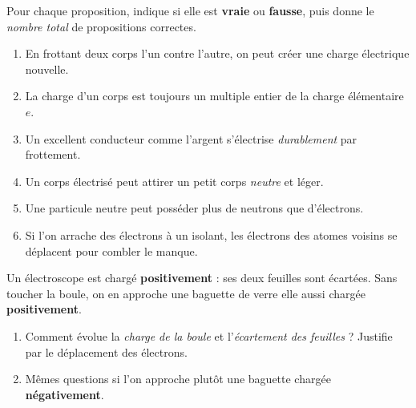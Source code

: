 \documentclass[11pt,a4paper]{article}
\begin{document}

\begin{exo}
Pour chaque proposition, indique si elle est \textbf{vraie} ou \textbf{fausse}, puis donne le
\emph{nombre total} de propositions correctes.
\begin{enumerate}[label=\alph*)]
  \item En frottant deux corps l'un contre l'autre, on peut créer une charge électrique nouvelle.
  \item La charge d'un corps est toujours un multiple entier de la charge élémentaire $e$.
  \item Un excellent conducteur comme l'argent s'électrise \emph{durablement} par frottement.
  \item Un corps électrisé peut attirer un petit corps \emph{neutre} et léger.
  \item Une particule neutre peut posséder plus de neutrons que d'électrons.
  \item Si l'on arrache des électrons à un isolant, les électrons des atomes voisins se déplacent
        pour combler le manque.
\end{enumerate}
\end{exo}

\begin{exo}
Un électroscope est chargé \textbf{positivement} : ses deux feuilles sont écartées. Sans toucher la
boule, on en approche une baguette de verre elle aussi chargée \textbf{positivement}.
\begin{center}
\end{center}
\begin{enumerate}[label=\alph*)]
  \item Comment évolue la \emph{charge de la boule} et l'\emph{écartement des feuilles} ? Justifie
        par le déplacement des électrons.
  \item Mêmes questions si l'on approche plutôt une baguette chargée \textbf{négativement}.
\end{enumerate}
\end{exo}
\end{document}
